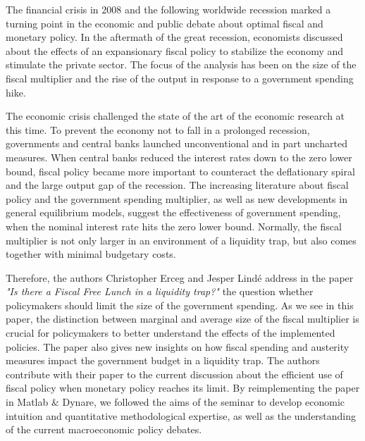 \documentclass[12pt,a4paper,oneside,titlepage]{article}
\begin{document}
The financial crisis in 2008 and the following worldwide recession marked a turning point in the economic and public debate about optimal fiscal and monetary policy. In the aftermath of the great recession, economists discussed about the effects of an expansionary fiscal policy to stabilize the economy and stimulate the private sector. The focus of the analysis has been on the size of the fiscal multiplier and the rise of the output in response to a government spending hike.
\par
\bigskip
The economic crisis challenged the state of the art of the economic research at this time. To prevent the economy not to fall in a prolonged recession, governments and central banks launched unconventional and in part uncharted measures. When central banks reduced the interest rates down to the zero lower bound, fiscal policy became more important to counteract the deflationary spiral and the large output gap of the recession. The increasing literature about fiscal policy and the government spending multiplier, as well as new developments in general equilibrium models, suggest the effectiveness of government spending, when the nominal interest rate hits the zero lower bound. Normally, the fiscal multiplier is not only larger in an environment of a liquidity trap, but also comes together with minimal budgetary costs.
\par
\bigskip
Therefore, the authors Christopher Erceg and Jesper Lindé address in the paper \textit{"Is there a Fiscal Free Lunch in a liquidity trap?"} the question whether policymakers should limit the size of the government spending. As we see in this paper, the distinction between marginal and average size of the fiscal multiplier is crucial for policymakers to better understand the effects of the implemented policies. The paper also gives new insights on how fiscal spending and austerity measures impact the government budget in a liquidity trap. The authors contribute with their paper to the current discussion about the efficient use of fiscal policy when monetary policy reaches its limit. By reimplementing the paper in Matlab \& Dynare, we followed the aims of the seminar to develop economic intuition and quantitative
methodological expertise, as well as the understanding of the current macroeconomic policy debates.
\par
\bigskip
\end{document}
